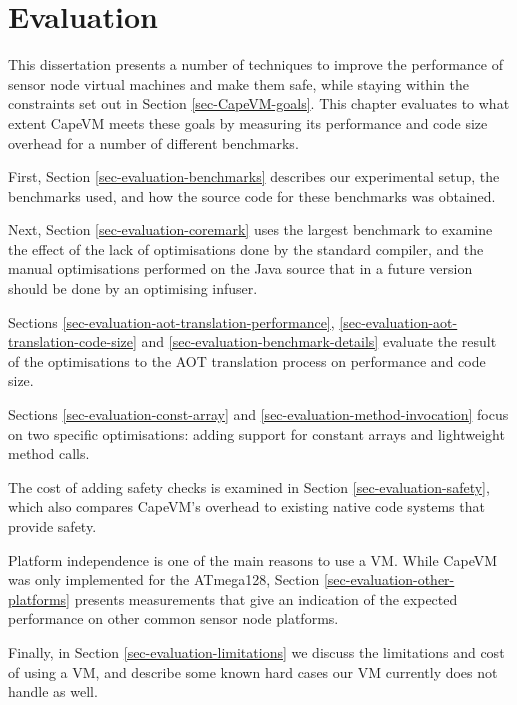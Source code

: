 \chapter{Evaluation}
\label{sec-evaluation}
This dissertation presents a number of techniques to improve the performance of sensor node virtual machines and make them safe, while staying within the constraints set out in Section \ref{sec-CapeVM-goals}. This chapter evaluates to what extent CapeVM meets these goals by measuring its performance and code size overhead for a number of different benchmarks.

First, Section \ref{sec-evaluation-benchmarks} describes our experimental setup, the benchmarks used, and how the source code for these benchmarks was obtained.

Next, Section \ref{sec-evaluation-coremark} uses the largest benchmark to examine the effect of the lack of optimisations done by the standard  compiler, and the manual optimisations performed on the Java source that in a future version should be done by an optimising infuser.

Sections \ref{sec-evaluation-aot-translation-performance}, \ref{sec-evaluation-aot-translation-code-size} and \ref{sec-evaluation-benchmark-details} evaluate the result of the optimisations to the AOT translation process on performance and code size.

Sections \ref{sec-evaluation-const-array} and \ref{sec-evaluation-method-invocation} focus on two specific optimisations: adding support for constant arrays and lightweight method calls.

The cost of adding safety checks is examined in Section \ref{sec-evaluation-safety}, which also compares CapeVM's overhead to existing native code systems that provide safety.

Platform independence is one of the main reasons to use a VM. While CapeVM was only implemented for the ATmega128, Section \ref{sec-evaluation-other-platforms} presents measurements that give an indication of the expected performance on other common sensor node platforms.

Finally, in Section \ref{sec-evaluation-limitations} we discuss the limitations and cost of using a VM, and describe some known hard cases our VM currently does not handle as well.
